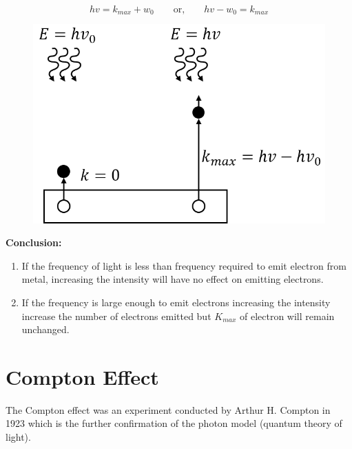 \documentclass[../main.tex]{subfiles}
\begin{document}
    \begin{equation*}
        \boxed{hv=k_{max}+w_0\qquad \text{or,}\qquad hv-w_0=k_{max}}
    \end{equation*}
    \begin{figure}[ht]
        \centering
        \includegraphics[scale=1]{photoenergy.png}
    \end{figure}
    \textbf{Conclusion:}
    \begin{enumerate}
        \item If the frequency of light is less than frequency required to emit electron from metal, increasing the intensity will have no effect on emitting electrons.
        \item If the frequency is large enough to emit electrons increasing the intensity increase the number of electrons emitted but $ K_{max} $ of electron will remain unchanged.
    \end{enumerate}
    \section{Compton Effect}
    The Compton effect was an experiment conducted by Arthur H. Compton in 1923 which is the further confirmation of the photon model (quantum theory of light).
\end{document}

